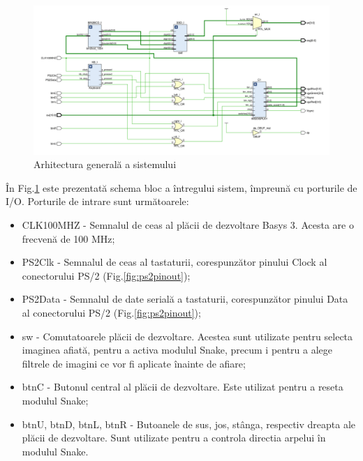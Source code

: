 \documentclass[a4paper,11pt,romanian]{article}
\begin{document}
{ \begin{figure}
  \begin{center}
   \hspace*{-1.3in}
   \includegraphics[scale=0.35]{schemabloc.png}
   \caption{Arhitectura general\u{a} a sistemului}
   \label{fig:schemabloc}
  \end{center}
 \end{figure}
\^{I}n Fig.\ref{fig:schemabloc} este prezentat\u{a} schema bloc a \^{i}ntregului sistem, \^{i}mpreun\u{a} cu porturile de I/O.
Porturile de intrare sunt urm\u{a}toarele:
\begin{itemize}
 \item CLK100MHZ - Semnalul de ceas al pl\u{a}cii de dezvoltare Basys 3. Acesta are o frecven\u{a} de 100 MHz;
 \item PS2Clk - Semnalul de ceas al tastaturii, corespunz\u{a}tor pinului Clock al conectorului PS/2 (Fig.\ref{fig:ps2pinout});
 \item PS2Data - Semnalul de date serial\u{a} a tastaturii, corespunz\u{a}tor pinului Data al conectorului PS/2 (Fig.\ref{fig:ps2pinout});
 \item sw - Comutatoarele pl\u{a}cii de dezvoltare. Acestea sunt utilizate pentru selecta imaginea afiat\u{a}, pentru a activa modulul Snake, precum i pentru a alege filtrele de imagini ce vor fi aplicate \^{i}nainte de afiare;
 \item btnC - Butonul central al pl\u{a}cii de dezvoltare. Este utilizat pentru a reseta modulul Snake;
 \item btnU, btnD, btnL, btnR - Butoanele de sus, jos, st\^{a}nga, respectiv dreapta ale pl\u{a}cii de dezvoltare. Sunt utilizate pentru a controla directia arpelui \^{i}n modulul Snake.
\end{itemize}

}
\end{document}
